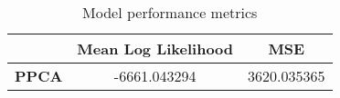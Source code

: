 \begin{table}
\centering
\caption{Model performance metrics}
\label{table:metrics}
\begin{tabular}{ccc}
\toprule
{} &  \textbf{Mean Log Likelihood} &  \textbf{MSE} \\
\midrule
\textbf{PPCA} &                  -6661.043294 &   3620.035365 \\
\bottomrule
\end{tabular}
\end{table}
